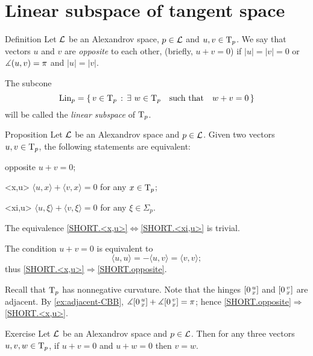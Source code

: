 \section{Linear subspace of tangent space}

\begin{thm}{Definition}\label{def:opp+Lin}
Let $\mathcal{L}$ be an Alexandrov space, $p\in \mathcal{L}$ and $u,v\in\mathrm{T}_p$.
We say that vectors $u$ and $v$ are \emph{opposite}\label{def:opposite:page} to each other, (briefly, $u+v=0$) if $|u|=|v|=0$ or $\measuredangle(u,v)=\pi$ and $|u|=|v|$.

The subcone
\[\mathop{\rm Lin}\nolimits_p=\left\{\,{v\in\mathrm{T}_p}\,:\,{\exists\ w\in\mathrm{T}_p\quad \text{such that}\quad w+v=0}\,\right\}\]
will be called the \emph{linear subspace} of $\mathrm{T}_p$.
\end{thm}

\begin{thm}{Proposition}\label{prop:opposite}
Let $\mathcal{L}$ be an Alexandrov space and $p\in \mathcal{L}$.
Given two vectors $u,v\in\mathrm{T}_p$, the following statements are equivalent:
\begin{subthm}{opposite} $u+v=0$;
\end{subthm}
\begin{subthm}{<x,u>} $\langle u,x\rangle +\langle v,x\rangle =0$ for any $x\in\mathrm{T}_p$;
\end{subthm}
\begin{subthm}{<xi,u>} $\langle u,\xi\rangle +\langle v,\xi\rangle =0$ for any $\xi\in\Sigma_p$.
\end{subthm}
\end{thm}

The equivalence  \ref{SHORT.<x,u>}$\Leftrightarrow$\ref{SHORT.<xi,u>} is trivial.

The condition $u+v=0$ is equivalent to 
\[\langle u,u\rangle =-\langle u,v\rangle =\langle v,v\rangle ;\]
thus 
\ref{SHORT.<x,u>}$\Rightarrow$\ref{SHORT.opposite}.

Recall that $\mathrm{T}_p$ has nonnegative curvature.
Note that the hinges $[0\,{}^{u}_{x}]$ and $[0\,{}^{v}_{x}]$ are adjacent.
By \ref{ex:adjacent-CBB}, $\measuredangle[0\,{}^{u}_{x}]+\measuredangle[0\,{}^{v}_{x}]=\pi$;
hence \ref{SHORT.opposite}$\Rightarrow$\ref{SHORT.<x,u>}.
\qeds

\begin{thm}{Exercise}\label{prop:two-opp}
Let $\mathcal{L}$  be an Alexandrov space and $p\in \mathcal{L}$.
Then for any three vectors $u,v,w\in\mathrm{T}_p$, if $u+v=0$ and $u+ w=0$ then $v=w$.
\end{thm}

